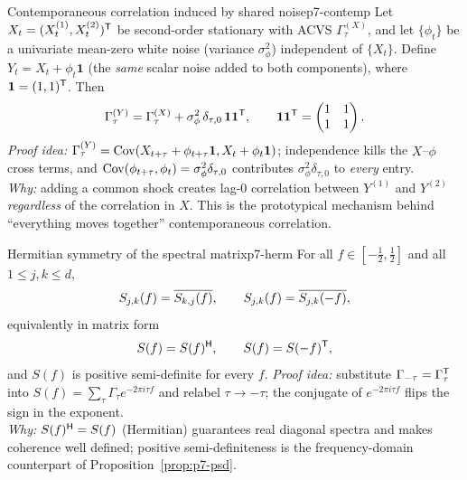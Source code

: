 \begin{proposition}{Contemporaneous correlation induced by shared noise}{p7-contemp}
Let $X_t=(X_t^{(1)},X_t^{(2)})^{\mathsf{T}}$ be second-order stationary with ACVS
$\Gamma_\tau^{(X)}$, and let $\{\phi_t\}$ be a univariate mean-zero white noise
(variance $\sigma_\phi^2$) independent of $\{X_t\}$. Define
$Y_t=X_t+\phi_t\mathbf{1}$ (the \emph{same} scalar noise added to both
components), where $\mathbf{1}=(1,1)^{\mathsf{T}}$. Then
\[
\Gamma_\tau^{(Y)}=\Gamma_\tau^{(X)}+\sigma_\phi^2\,\delta_{\tau,0}\,\mathbf 1\mathbf 1^{\mathsf{T}} ,
\qquad
\mathbf 1\mathbf 1^{\mathsf{T}}=\begin{pmatrix}1&1\\1&1\end{pmatrix}.
\]
\textit{Proof idea:} $\Gamma_\tau^{(Y)}=\operatorname{Cov}(X_{t+\tau}+\phi_{t+\tau}\mathbf1,
X_t+\phi_t\mathbf1)$; independence kills the $X$--$\phi$ cross terms, and
$\operatorname{Cov}(\phi_{t+\tau},\phi_t)=\sigma_\phi^2\delta_{\tau,0}$ contributes
$\sigma_\phi^2\delta_{\tau,0}$ to \emph{every} entry.\\
\textit{Why:} adding a common shock creates lag-$0$ correlation between
$Y^{(1)}$ and $Y^{(2)}$ \emph{regardless} of the correlation in $X$. This is the
prototypical mechanism behind ``everything moves together'' contemporaneous
correlation.
\end{proposition}

\begin{proposition}{Hermitian symmetry of the spectral matrix}{p7-herm}
For all $f\in[-\tfrac12,\tfrac12]$ and all $1\le j,k\le d$,
\[
S_{j,k}(f)=\overline{S_{k,j}(f)},\qquad
S_{j,k}(f)=\overline{S_{j,k}(-f)},
\]
equivalently in matrix form
\[
S(f)=S(f)^{\mathsf{H}},\qquad S(f)=S(-f)^{\mathsf{T}} ,
\]
and $S(f)$ is positive semi-definite for every $f$.
\textit{Proof idea:} substitute $\Gamma_{-\tau}=\Gamma_\tau^{\mathsf{T}}$ into
$S(f)=\sum_\tau\Gamma_\tau e^{-2\pi i\tau f}$ and relabel $\tau\to-\tau$; the
conjugate of $e^{-2\pi i\tau f}$ flips the sign in the exponent.\\
\textit{Why:} $S(f)^{\mathsf{H}}=S(f)$ (Hermitian) guarantees real diagonal spectra and
makes coherence well defined; positive semi-definiteness is the frequency-domain
counterpart of Proposition~\ref{prop:p7-psd}.
\end{proposition}


